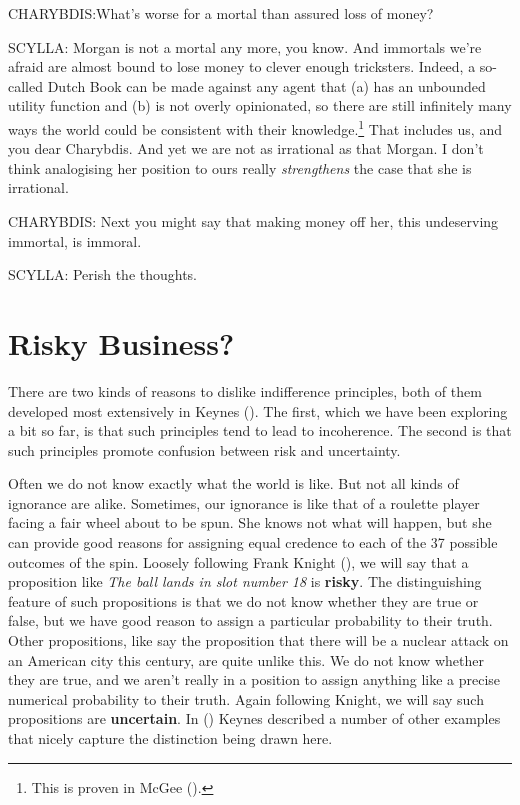 \documentclass[
  11pt,
  letterpaper,
  DIV=11,
  numbers=noendperiod,
  twoside]{scrartcl}
\begin{document}
CHARYBDIS:What's worse for a mortal than assured loss of money?

SCYLLA: Morgan is not a mortal any more, you know. And immortals we're
afraid are almost bound to lose money to clever enough tricksters.
Indeed, a so-called Dutch Book can be made against any agent that (a)
has an unbounded utility function and (b) is not overly opinionated, so
there are still infinitely many ways the world could be consistent with
their knowledge.\footnote{This is proven in McGee
  ().} That includes us, and you dear
Charybdis. And yet we are not as irrational as that Morgan. I don't
think analogising her position to ours really \emph{strengthens} the
case that she is irrational.

CHARYBDIS: Next you might say that making money off her, this
undeserving immortal, is immoral.

SCYLLA: Perish the thoughts.

\section{Risky Business?}\label{risky-business}

There are two kinds of reasons to dislike indifference principles, both
of them developed most extensively in Keynes
(). The first, which we have been
exploring a bit so far, is that such principles tend to lead to
incoherence. The second is that such principles promote confusion
between risk and uncertainty.

Often we do not know exactly what the world is like. But not all kinds
of ignorance are alike. Sometimes, our ignorance is like that of a
roulette player facing a fair wheel about to be spun. She knows not what
will happen, but she can provide good reasons for assigning equal
credence to each of the 37 possible outcomes of the spin. Loosely
following Frank Knight (), we will say
that a proposition like \emph{The ball lands in slot number 18} is
\textbf{risky}. The distinguishing feature of such propositions is that
we do not know whether they are true or false, but we have good reason
to assign a particular probability to their truth. Other propositions,
like say the proposition that there will be a nuclear attack on an
American city this century, are quite unlike this. We do not know
whether they are true, and we aren't really in a position to assign
anything like a precise numerical probability to their truth. Again
following Knight, we will say such propositions are \textbf{uncertain}.
In () Keynes described a number of other
examples that nicely capture the distinction being drawn here.
\end{document}
